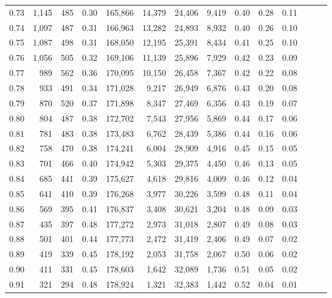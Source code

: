 \begin{tabular}{rrrrrrrrrrrrrr}
0.73 &  1,145 &  485 &  0.30 &  165,866 &   14,379 &  24,406 &   9,419 &  0.40 &  0.28 &      0.11 \\
0.74 &  1,097 &  487 &  0.31 &  166,963 &   13,282 &  24,893 &   8,932 &  0.40 &  0.26 &      0.10 \\
0.75 &  1,087 &  498 &  0.31 &  168,050 &   12,195 &  25,391 &   8,434 &  0.41 &  0.25 &      0.10 \\
0.76 &  1,056 &  505 &  0.32 &  169,106 &   11,139 &  25,896 &   7,929 &  0.42 &  0.23 &      0.09 \\
0.77 &    989 &  562 &  0.36 &  170,095 &   10,150 &  26,458 &   7,367 &  0.42 &  0.22 &      0.08 \\
0.78 &    933 &  491 &  0.34 &  171,028 &    9,217 &  26,949 &   6,876 &  0.43 &  0.20 &      0.08 \\
0.79 &    870 &  520 &  0.37 &  171,898 &    8,347 &  27,469 &   6,356 &  0.43 &  0.19 &      0.07 \\
0.80 &    804 &  487 &  0.38 &  172,702 &    7,543 &  27,956 &   5,869 &  0.44 &  0.17 &      0.06 \\
0.81 &    781 &  483 &  0.38 &  173,483 &    6,762 &  28,439 &   5,386 &  0.44 &  0.16 &      0.06 \\
0.82 &    758 &  470 &  0.38 &  174,241 &    6,004 &  28,909 &   4,916 &  0.45 &  0.15 &      0.05 \\
0.83 &    701 &  466 &  0.40 &  174,942 &    5,303 &  29,375 &   4,450 &  0.46 &  0.13 &      0.05 \\
0.84 &    685 &  441 &  0.39 &  175,627 &    4,618 &  29,816 &   4,009 &  0.46 &  0.12 &      0.04 \\
0.85 &    641 &  410 &  0.39 &  176,268 &    3,977 &  30,226 &   3,599 &  0.48 &  0.11 &      0.04 \\
0.86 &    569 &  395 &  0.41 &  176,837 &    3,408 &  30,621 &   3,204 &  0.48 &  0.09 &      0.03 \\
0.87 &    435 &  397 &  0.48 &  177,272 &    2,973 &  31,018 &   2,807 &  0.49 &  0.08 &      0.03 \\
0.88 &    501 &  401 &  0.44 &  177,773 &    2,472 &  31,419 &   2,406 &  0.49 &  0.07 &      0.02 \\
0.89 &    419 &  339 &  0.45 &  178,192 &    2,053 &  31,758 &   2,067 &  0.50 &  0.06 &      0.02 \\
0.90 &    411 &  331 &  0.45 &  178,603 &    1,642 &  32,089 &   1,736 &  0.51 &  0.05 &      0.02 \\
0.91 &    321 &  294 &  0.48 &  178,924 &    1,321 &  32,383 &   1,442 &  0.52 &  0.04 &      0.01 \\

\end{tabular}
